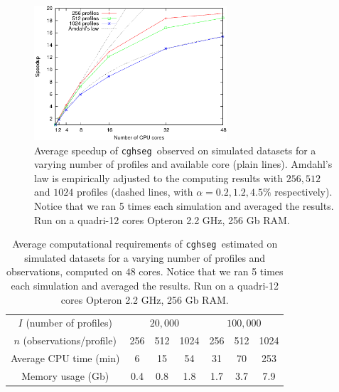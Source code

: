 \documentclass[11pt]{llncs}
\newcommand{\esoft}{\texttt{cghseg }}
\begin{document}
\begin{figure}[h!]
  \begin{center}
    \includegraphics[height=5cm]{figures/speedup}
    \caption{Average speedup of \esoft observed  on simulated datasets for a varying number of profiles and available core (plain lines). Amdahl's law is empirically adjusted to the computing results with $256,512$ and $1024$ profiles (dashed lines, with $\alpha=0.2,1.2,4.5\%$ respectively). Notice that we ran 5 times each simulation and averaged the results. Run on a quadri-12 cores Opteron 2.2 GHz, 256 Gb RAM.}
    \label{figspeedup}
  \end{center}
\end{figure}

\begin{table}[h!]
  \begin{center}
    \begin{tabular}{|c|ccc|ccc|}
      \hline
      $I$ (number of profiles) &  \multicolumn{3}{c}{$20,000$} & \multicolumn{3}{c|}{$100,000$} \\
      $n$ (observations/profile) & 256 & 512 & 1024 & 256 & 512 & 1024\\
      \hline
      Average CPU time (min) & 6 & 15 & 54     & 31 & 70 & 253 \\
      Memory usage (Gb)      & 0.4 & 0.8 & 1.8    &  1.7 & 3.7 & 7.9 \\
      \hline
    \end{tabular}
    \caption{Average computational requirements of \esoft estimated on simulated datasets for a varying number of profiles and observations, computed on $48$ cores. Notice that we ran 5 times each simulation and averaged the results. Run on a quadri-12 cores Opteron 2.2 GHz, 256 Gb RAM.}
    \label{tabtime}
  \end{center}
\end{table}



\end{document}
